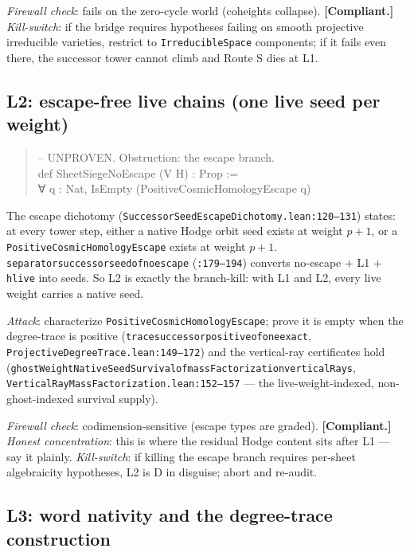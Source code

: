 \documentclass[11pt]{article}
\renewcommand{\_}{\textunderscore\allowbreak}
\newcommand{\status}[1]{\textbf{[#1]}}
\begin{document}
\emph{Firewall check}: fails on the zero-cycle world (coheights collapse).
\status{Compliant.} \emph{Kill-switch}: if the bridge requires hypotheses
failing on smooth projective irreducible varieties, restrict to
\texttt{IrreducibleSpace} components; if it fails even there, the successor
tower cannot climb and Route S dies at L1.

\subsection{L2: escape-free live chains (one live seed per weight)}

\begin{quote}\small\ttfamily
-- UNPROVEN. Obstruction: the escape branch.\\
def SheetSiegeNoEscape (V H) : Prop :=\\
\phantom{~}∀ q : Nat, IsEmpty (PositiveCosmicHomologyEscape q)
\end{quote}
The escape dichotomy (\texttt{SuccessorSeedEscapeDichotomy.lean:120--131})
states: at every tower step, either a native Hodge orbit seed exists at weight
$p+1$, or a \texttt{PositiveCosmicHomologyEscape} exists at weight $p+1$.
\texttt{separator\_successor\_seed\_of\_no\_escape} (\texttt{:179--194})
converts no-escape $+$ L1 $+$ \texttt{hlive} into seeds. So L2 is exactly the
branch-kill: with L1 and L2, every live weight carries a native seed.

\emph{Attack}: characterize \texttt{PositiveCosmicHomologyEscape}; prove it is
empty when the degree-trace is positive \linebreak
(\texttt{trace\_successor\_positive\_of\_one\_exact},
\texttt{ProjectiveDegreeTrace.lean:149--172}) and the vertical-ray
certificates hold
(\texttt{ghostWeightNativeSeedSurvival\_of\_massFactorization\_verticalRays},
\texttt{VerticalRayMassFactorization.lean:152--157} --- the live-weight-indexed,
non-ghost-indexed survival supply).

\emph{Firewall check}: codimension-sensitive (escape types are graded).
\status{Compliant.} \emph{Honest concentration}: this is where the residual
Hodge content sits after L1 --- say it plainly. \emph{Kill-switch}: if killing
the escape branch requires per-sheet algebraicity hypotheses, L2 is D in
disguise; abort and re-audit.

\subsection{L3: word nativity and the degree-trace construction}
\end{document}
